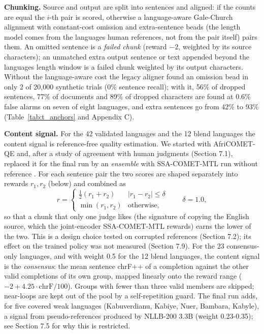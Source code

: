 \textbf{Chunking.} Source and output are split into sentences and aligned: if the counts are equal the \(i\)-th pair is scored, otherwise a language-aware Gale-Church alignment \citep{gale1993program} with constant-cost omission and extra-sentence beads (the length model comes from the language\textquotesingle s human references, not from the pair itself) pairs them. An omitted sentence is a \emph{failed chunk} (reward \(-2\), weighted by its source characters); an unmatched extra output sentence or text appended beyond the language\textquotesingle s length window is a failed chunk weighted by its output characters. Without the language-aware cost the legacy aligner found an omission bead in only 2 of 20,000 synthetic trials (0\% sentence recall); with it, 56\% of dropped sentences, 77\% of documents and 89\% of dropped characters are found at 0.6\% false alarms on seven of eight languages, and extra sentences go from 42\% to 93\% (Table~\ref{tab:t_anchors} and Appendix C).

\textbf{Content signal.} For the 42 validated languages and the 12 blend languages the content signal is reference-free quality estimation. We started with AfriCOMET-QE \citep{wang2024africomet} and, after a study of agreement with human judgments (Section 7.1), replaced it for the final run by an \emph{ensemble} with SSA-COMET-MTL run without reference \citep{li2025ssacomet}. For each sentence pair the two scores are shaped separately into rewards \(r_1,r_2\) (below) and combined as \[r = \begin{cases} \tfrac12 (r_1 + r_2) & |r_1 - r_2| \le \delta \\ \min(r_1, r_2) & \text{otherwise,}\end{cases}\qquad \delta = 1.0,\] so that a chunk that only one judge likes (the signature of copying the English source, which the joint-encoder SSA-COMET-MTL rewards) earns the lower of the two. This is a design choice tested on corrupted references (Section 7.2); its effect on the trained policy was not measured (Section 7.9). For the 23 consensus-only languages, and with weight 0.5 for the 12 blend languages, the content signal is the \emph{consensus}: the mean sentence chrF++ of a completion against the other valid completions of its own group, mapped linearly onto the reward range (\(-2 + 4.25\cdot\mathrm{chrF}/100\)). Groups with fewer than three valid members are skipped; near-loops are kept out of the pool by a self-repetition guard. The final run adds, for five covered weak languages (Kabuverdianu, Kabiye, Nuer, Bambara, Kabyle), a signal from pseudo-references produced by NLLB-200 3.3B (weight 0.23-0.35); see Section 7.5 for why this is restricted.

